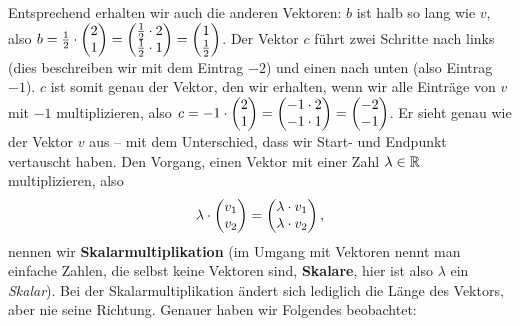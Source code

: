 \documentclass[../../main.tex]{subfiles}
\begin{document}
\begin{multicols}{3}


\end{multicols}
Entsprechend erhalten wir auch die anderen Vektoren: $b$ ist halb so lang wie $v$, 
also $b=\frac{1}{2}\cdot\begin{pmatrix} 2\\ 1 \end{pmatrix}=\begin{pmatrix} \frac{1}{2}\cdot 2\\ \frac{1}{2}\cdot 1 \end{pmatrix}=\begin{pmatrix} 1\\ \frac{1}{2} \end{pmatrix}$. Der Vektor $c$ führt zwei Schritte nach links (dies
beschreiben wir mit dem Eintrag $-2$) und einen nach unten (also Eintrag $-1$). $c$ ist somit genau der Vektor, den wir
erhalten, wenn wir alle Einträge von $v$ mit $-1$ multiplizieren, also $c=-1\cdot\begin{pmatrix} 2\\ 1 \end{pmatrix}=\begin{pmatrix} -1\cdot 2\\ -1\cdot 1 \end{pmatrix}=\begin{pmatrix} -2\\ -1 \end{pmatrix}$. Er
sieht genau wie der Vektor $v$ aus -- mit dem Unterschied, dass wir Start- und Endpunkt vertauscht haben. Den Vorgang, 
einen Vektor mit einer Zahl $\lambda\in\mathbb{R}$ multiplizieren, also
\[\lambda\cdot\begin{pmatrix} v_1\\ v_2 \end{pmatrix}=\begin{pmatrix} \lambda\cdot v_1\\ \lambda\cdot v_2 \end{pmatrix},\]
nennen wir \textbf{Skalarmultiplikation} (im 
Umgang mit Vektoren nennt man einfache Zahlen, die selbst keine Vektoren sind, \textbf{Skalare}, hier ist also $\lambda$ ein \emph{Skalar}).
Bei der Skalarmultiplikation ändert sich lediglich die Länge des Vektors, aber nie seine Richtung. Genauer haben wir 
Folgendes beobachtet:
\end{document}
